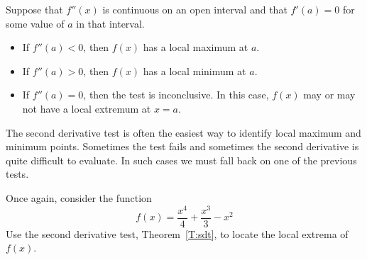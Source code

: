 \begin{mainTheorem}\label{T:sdt}
Suppose that $f''(x)$ is continuous on an open interval and that
$f'(a)=0$ for some value of $a$ in that interval.
\begin{itemize}
\item If $f''(a) <0$, then $f(x)$ has a local maximum at $a$.
\item If $f''(a) >0$, then $f(x)$ has a local minimum at $a$.
\item If $f''(a) =0$, then the test is inconclusive. In this case,
  $f(x)$ may or may not have a local extremum at $x=a$.
\end{itemize}
\end{mainTheorem}


The second derivative test is often the easiest way to identify local
maximum and minimum points. Sometimes the test fails and sometimes
the second derivative is quite difficult to evaluate. In such cases we
must fall back on one of the previous tests.

\begin{example}
Once again, consider the function 
\[
f(x) = \frac{x^4}{4}+\frac{x^3}{3}-x^2
\]
Use the second derivative test, Theorem~\ref{T:sdt}, to locate the
local extrema of $f(x)$.
\end{example}


